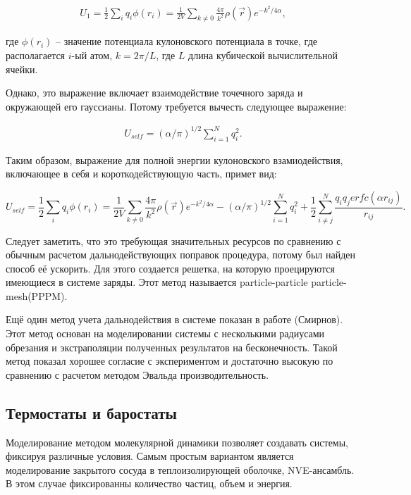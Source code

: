 \begin{align}
    U_1 = \frac{1}{2}\sum_{i}q_i \phi(r_i) = \frac{1}{2V}\sum_{k \neq 0} \frac{4\pi}{k^2}\rho(\overrightarrow{r})e^{-k^2/4\alpha},
\end{align}

где $\phi(r_i)$ \--- значение потенциала кулоновского потенциала в точке, где располагается $i$-ый атом, $k = 2\pi/L$, где $L$ длина кубической вычислительной ячейки.

Однако, это выражение включает взаимодействие точечного заряда и окружающей его гауссианы. Потому требуется вычесть следующее выражение:

\begin{align}
    U_{self} = (\alpha/\pi)^{1/2} \sum_{i = 1}^N q_i^2.
\end{align}

Таким образом, выражение для полной энергии кулоновского взамиодействия, включающее в себя и короткодействующую часть, примет вид:

\begin{equation}
    U_{self} = \frac{1}{2}\sum_{i}q_i \phi(r_i) = \frac{1}{2V}\sum_{k \neq 0} \frac{4\pi}{k^2}\rho(\overrightarrow{r})e^{-k^2/4\alpha} - (\alpha/\pi)^{1/2} \sum_{i = 1}^N q_i^2 + \frac{1}{2}\sum_{i \neq j}^N \frac{q_i q_j erfc(\alpha r_{ij})}{r_{ij}}.
\end{equation}

Следует заметить, что это требующая значительных ресурсов по сравнению с обычным расчетом дальнодействующих поправок процедура, потому был найден способ её ускорить. Для этого создается решетка, на которую проецируются имеющиеся в системе заряды. Этот метод называется particle-particle particle-mesh(PPPM).

Ещё один метод учета дальнодействия в системе показан в работе (Смирнов). Этот метод основан на моделировании системы с несколькими радиусами обрезания и экстраполяции полученных результатов на бесконечность. Такой метод показал хорошее согласие с экспериментом и достаточно высокую по сравнению с расчетом методом Эвальда производительность.

\subsection{Термостаты и баростаты}

Моделирование методом молекулярной динамики позволяет создавать системы, фиксируя различные условия. Самым простым вариантом является моделирование закрытого сосуда в теплоизолирующей оболочке, NVE-ансамбль. В этом случае фиксированны количество частиц, объем и энергия. 

